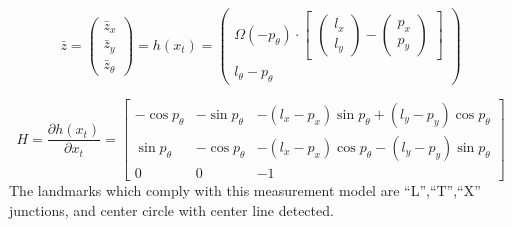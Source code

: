 \begin{equation}\label{eq:hx2}
  \bar{z} = \begin{pmatrix}
\bar{z}_{x}\\ 
\bar{z}_{y} \\
\bar{z}_{\theta} 
\end{pmatrix}
= 
h(x_t)
=
\begin{pmatrix}

\Omega(-p_{\theta})
\cdot
\begin{bmatrix}
 \begin{pmatrix}
l_{x}\\ 
l_{y}
\end{pmatrix}
-
\begin{pmatrix}
p_{x}\\ 
p_{y}
\end{pmatrix}
\end{bmatrix} \\
l_{\theta} - p_{\theta}
\end{pmatrix}
\end{equation}

\begin{equation}\label{eq:jH2}
H =
\frac{\partial h(x_t)}{\partial x_t}
=
\begin{bmatrix}
  -\cos{p_{\theta}} & -\sin{p_{\theta}} & -(l_x-p_x)\sin{p_{\theta}} + (l_y-p_y)\cos{p_{\theta}} \\ 
  \sin{p_{\theta}} & -\cos{p_{\theta}} & -(l_x-p_x)\cos{p_{\theta}} - (l_y-p_y)\sin{p_{\theta}}  \\
  0 & 0 & -1
\end{bmatrix}
\end{equation}
The landmarks which comply with this measurement model are ``L'',``T'',``X'' junctions, and center circle with center line detected.

